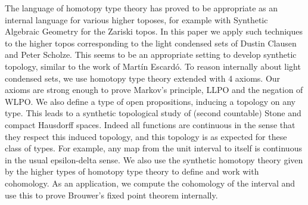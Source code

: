 The language of homotopy type theory has proved to be appropriate as an internal language for various higher toposes, 
for example with Synthetic Algebraic Geometry for the Zariski topos.
In this paper we apply such techniques to the higher topos corresponding to the light condensed sets 
of Dustin Clausen and Peter Scholze.
This seems to be an appropriate setting to develop synthetic topology, similar to the work of 
Martín Escardó.
To reason internally about light condensed sets, we use homotopy type theory extended with 4 axioms.
Our axioms are strong enough to prove Markov's principle, LLPO and the negation of WLPO. 
We also define a type of open propositions, inducing a topology on any type. 
This leads to a synthetic topological study of (second countable)
Stone and compact Hausdorff spaces. 
Indeed all functions are continuous in the sense that they respect this induced topology, 
and this topology is as expected for these class of types.
For example, any map from the unit interval to itself is continuous in the usual epsilon-delta sense.
We also use the synthetic homotopy theory 
given by the higher types of homotopy type theory to define and 
work with cohomology.
As an application, we compute the cohomology of the interval and use this to prove Brouwer's fixed point theorem
internally. 
